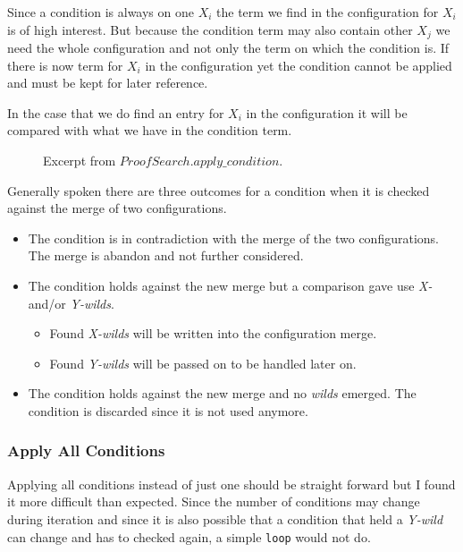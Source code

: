 Since a condition is always on one $X_i$ the term we find in the configuration for $X_i$ is of high interest. But because the condition term may also contain other $X_j$ we need the whole configuration and not only the term on which the condition is. If there is now term for $X_i$ in the configuration yet the condition cannot be applied and must be kept for later reference. 

In the case that we do find an entry for $X_i$ in the configuration it will be compared with what we have in the condition term.

\begin{figure}[H]
	\vspace{-10pt}
	
	\vspace{-10pt}
	\caption{Excerpt from $ProofSearch.apply\_condition$.  }
	\vspace{-10pt}
\end{figure}

Generally spoken there are three outcomes for a condition when it is checked against the merge of two configurations.

\begin{itemize}
	\item The condition is in contradiction with the merge of the two configurations. The merge is abandon and not further considered.
	\item The condition holds against the new merge but a comparison gave use \emph{X-} and/or \emph{Y-wilds}.
	\begin{itemize}
		\item Found \emph{X-wilds} will be written into the configuration merge.
		\item Found \emph{Y-wilds} will be passed on to be handled later on.
	\end{itemize}
	\item The condition holds against the new merge and no \emph{wilds} emerged. The condition is discarded since it is not used anymore.
\end{itemize}

\subsubsection{Apply All Conditions}
Applying all conditions instead of just one should be straight forward but I found it more difficult than expected. Since the number of conditions may change during iteration and since it is also possible that a condition that held a \emph{Y-wild} can change and has to checked again, a simple \texttt{loop} would not do.

